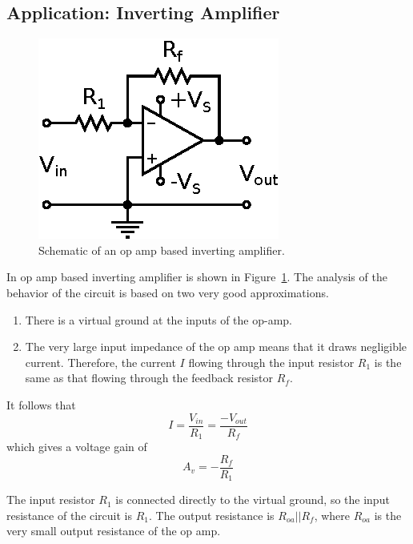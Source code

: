\documentclass[11pt]{article}
\begin{document}
\subsection{Application: Inverting Amplifier}
\label{sec:invertingamp}

\begin{figure}[ht]
  \begin{center}
    \includegraphics{invertingamp.eps}
    \caption{Schematic of an op amp based inverting amplifier.}
    \label{fig:invertingamp}
  \end{center}
\end{figure}

In op amp based inverting amplifier is shown in
Figure~\ref{fig:invertingamp}. The analysis of the behavior of the
circuit is based on two very good approximations.
\begin{enumerate}
\item There is a virtual ground at the inputs of the op-amp.
  
\item The very large input impedance of the op amp means that it draws
  negligible current. Therefore, the current $I$ flowing through the
  input resistor $R_1$ is the same as that flowing through the
  feedback resistor $R_f$.
\end{enumerate}
It follows that
\begin{equation}
  I = \frac{V_{in}}{R_1} = \frac{-V_{out}}{R_f}
\end{equation}
which gives a voltage gain of
\begin{equation}
  A_v = -\frac{R_f}{R_1}
  \label{eq:invampgain}
\end{equation}

The input resistor $R_1$ is connected directly to the virtual ground,
so the input resistance of the circuit is $R_1$. The output resistance
is $R_{oa}||R_f$, where $R_{oa}$ is the very small output resistance
of the op amp.
\end{document}

